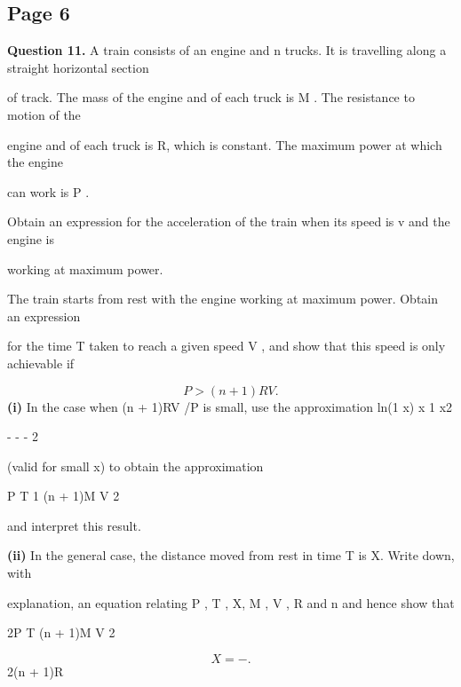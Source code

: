 \documentclass[12pt]{article}
\begin{document}
\subsection*{Page 6}
\begin{flushleft}
\bigskip\textbf{Question 11.} A train consists of an engine and n trucks. It is travelling along a straight horizontal section\par
of track. The mass of the engine and of each truck is M . The resistance to motion of the\par
engine and of each truck is R, which is constant. The maximum power at which the engine\par
can work is P .\par
Obtain an expression for the acceleration of the train when its speed is v and the engine is\par
working at maximum power.\par
The train starts from rest with the engine working at maximum power. Obtain an expression\par
for the time T taken to reach a given speed V , and show that this speed is only achievable if\par
\[P > (n + 1)RV .\]
\textbf{(i)} In the case when (n + 1)RV /P is small, use the approximation ln(1 x) x 1 x2\par
- \approx - - 2\par
(valid for small x) to obtain the approximation\par
P T 1 (n + 1)M V 2\par
{}\par
and interpret this result.\par
\textbf{(ii)} In the general case, the distance moved from rest in time T is X. Write down, with\par
explanation, an equation relating P , T , X, M , V , R and n and hence show that\par
2P T (n + 1)M V 2\par
\[X = - .\]
2(n + 1)R\par
\end{flushleft}
\end{document}
